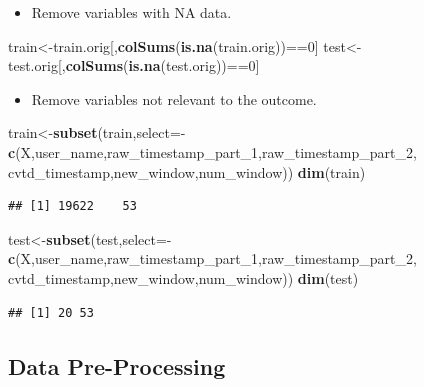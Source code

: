 \documentclass[]{article}
\newenvironment{Shaded}{\begin{snugshade}}{\end{snugshade}}
\newcommand{\KeywordTok}[1]{\textcolor[rgb]{0.13,0.29,0.53}{\textbf{{#1}}}}
\newcommand{\DataTypeTok}[1]{\textcolor[rgb]{0.13,0.29,0.53}{{#1}}}
\newcommand{\DecValTok}[1]{\textcolor[rgb]{0.00,0.00,0.81}{{#1}}}
\newcommand{\NormalTok}[1]{{#1}}
\begin{document}
\begin{itemize}
\itemsep1pt\parskip0pt
\item
  Remove variables with NA data.
\end{itemize}

\begin{Shaded}
\begin{Highlighting}[]
\NormalTok{train<-train.orig[,}\KeywordTok{colSums}\NormalTok{(}\KeywordTok{is.na}\NormalTok{(train.orig))==}\DecValTok{0}\NormalTok{]}
\NormalTok{test<-test.orig[,}\KeywordTok{colSums}\NormalTok{(}\KeywordTok{is.na}\NormalTok{(test.orig))==}\DecValTok{0}\NormalTok{]}
\end{Highlighting}
\end{Shaded}

\begin{itemize}
\itemsep1pt\parskip0pt
\item
  Remove variables not relevant to the outcome.
\end{itemize}

\begin{Shaded}
\begin{Highlighting}[]
\NormalTok{train<-}\KeywordTok{subset}\NormalTok{(train,}\DataTypeTok{select=}\NormalTok{-}\KeywordTok{c}\NormalTok{(X,user_name,raw_timestamp_part_1,raw_timestamp_part_2,}
                              \NormalTok{cvtd_timestamp,new_window,num_window))}
\KeywordTok{dim}\NormalTok{(train)}
\end{Highlighting}
\end{Shaded}

\begin{verbatim}
## [1] 19622    53
\end{verbatim}

\begin{Shaded}
\begin{Highlighting}[]
\NormalTok{test<-}\KeywordTok{subset}\NormalTok{(test,}\DataTypeTok{select=}\NormalTok{-}\KeywordTok{c}\NormalTok{(X,user_name,raw_timestamp_part_1,raw_timestamp_part_2,}
                            \NormalTok{cvtd_timestamp,new_window,num_window))}
\KeywordTok{dim}\NormalTok{(test)}
\end{Highlighting}
\end{Shaded}

\begin{verbatim}
## [1] 20 53
\end{verbatim}

\subsection{Data Pre-Processing}\label{data-pre-processing}
\end{document}
